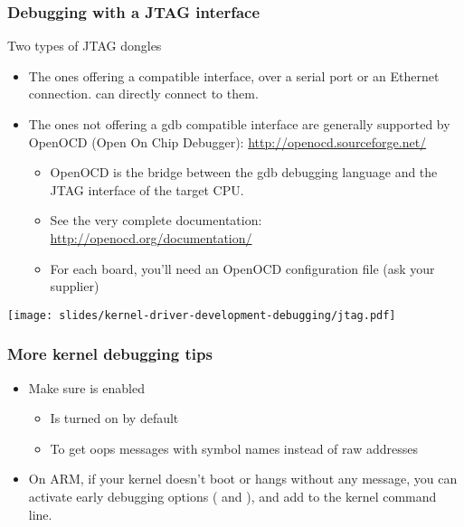 \begin{frame}
  \frametitle{Debugging with a JTAG interface}
  Two types of JTAG dongles
  \begin{itemize}
  \item The ones offering a  compatible interface, over a
    serial port or an Ethernet connection.  can directly
    connect to them.
  \item The ones not offering a gdb compatible interface are generally
    supported by OpenOCD (Open On Chip Debugger):
    \url{http://openocd.sourceforge.net/}
    \begin{itemize}
    \item OpenOCD is the bridge between the gdb debugging language
      and the JTAG interface of the target CPU.
    \item See the very complete documentation:
      \url{http://openocd.org/documentation/}
    \item For each board, you'll need an OpenOCD configuration file
      (ask your supplier)
    \end{itemize}
  \end{itemize}
   \begin{center}
     \texttt{[image: slides/kernel-driver-development-debugging/jtag.pdf]}
   \end{center}
\end{frame}

\begin{frame}
  \frametitle{More kernel debugging tips}
  \begin{itemize}
  \item Make sure  is enabled
    \begin{itemize}
    \item Is turned on by default
    \item To get oops messages with symbol names instead of raw addresses
    \end{itemize}
  \item On ARM, if your kernel doesn't boot or hangs without any
    message, you can activate early debugging options
    ( and ), and add
     to the kernel command line.
  \end{itemize}
\end{frame}
